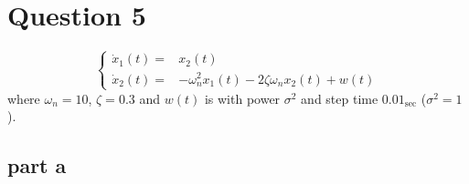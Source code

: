 \section{Question 5}
$$
\left\lbrace \begin{array}{cl}
    \dot{x}_1(t)  =& x_2(t)\\[1em]
    \dot{x}_2(t)  =& -\omega_n^2x_1(t) - 2\zeta\omega_nx_2(t) + w(t)
    \end{array}\right.
$$
where $\omega_n = 10$, $\zeta = 0.3$ and $w(t)$ is with power $\sigma^2$ and step time $0.01_{\sec}$ ($\sigma^2 = 1$).
\subsection{part a}
